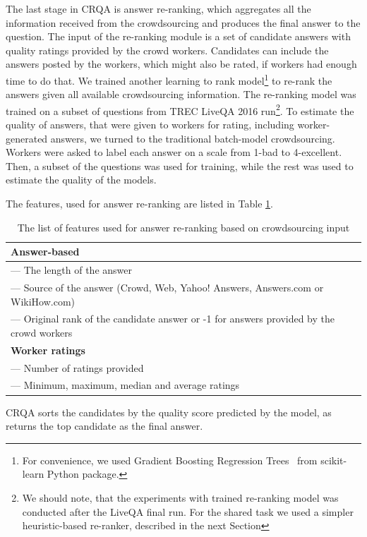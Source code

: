 \documentclass[letterpaper]{article}
\begin{document}
The last stage in CRQA is answer re-ranking, which aggregates all the information received from the crowdsourcing and produces the final answer to the question.
The input of the re-ranking module is a set of candidate answers with quality ratings provided by the crowd workers.
Candidates can include the answers posted by the workers, which might also be rated, if workers had enough time to do that.
We trained another learning to rank model\footnote{For convenience, we used Gradient Boosting Regression Trees~\cite{friedman2002stochastic} from scikit-learn Python package.} to re-rank the answers given all available crowdsourcing information.
The re-ranking model was trained on a subset of questions from TREC LiveQA 2016 run\footnote{We should note, that the experiments with trained re-ranking model was conducted after the LiveQA final run. For the shared task we used a simpler heuristic-based re-ranker, described in the next Section}.
To estimate the quality of answers, that were given to workers for rating, including worker-generated answers, we turned to the traditional batch-model crowdsourcing.
Workers were asked to label each answer on a scale from 1-bad to 4-excellent.
Then, a subset of the questions was used for training, while the rest was used to estimate the quality of the models.

The features, used for answer re-ranking are listed in Table \ref{table:reranking_features}.

\begin{table}[ht]
\centering
\begin{tabular}{| p{8cm} |}
\hline
\textbf{Answer-based} \\
\hline
--- The length of the answer \\
--- Source of the answer (Crowd, Web, Yahoo! Answers, Answers.com or WikiHow.com)\\
--- Original rank of the candidate answer or -1 for answers provided by the crowd workers\\
\hline
\textbf{Worker ratings} \\
\hline
--- Number of ratings provided\\
--- Minimum, maximum, median and average ratings\\
\hline
\end{tabular}
\caption{The list of features used for answer re-ranking based on crowdsourcing input}
\label{table:reranking_features}
\end{table}

CRQA sorts the candidates by the quality score predicted by the model, as returns the top candidate as the final answer.
\end{document}
